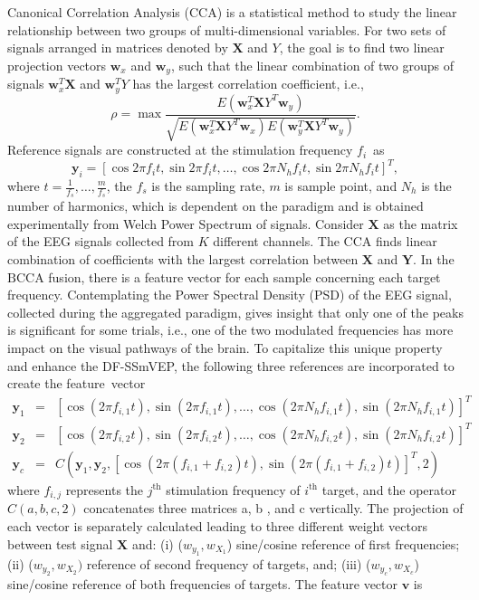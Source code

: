 \documentclass[sensors,accept,moreauthors,pdftex,10pt,a4paper]{mdpi}
\def\NH{N_h}
\def\y{\bm{y}}
\def\w{\bm{w}}
\def\Y{Y}
\def\X{\bm{X}}
\def\DCCA{\text{BCCA}}
\theoremstyle{mdpi}
\newcounter{ex}
\newcounter{re}
\theoremstyle{mdpidefinition}
\begin{document}
\noindent
Canonical Correlation Analysis (CCA) is a statistical method to study the linear relationship between two groups of multi-dimensional variables. For  two sets of signals arranged in matrices denoted by $\X$ and $\Y$, the goal is to find two linear projection vectors $\w_{x}$ and $\w_{y}$, such that the  linear combination of two groups of  signals $\w_{x}^{T}\X$ and  $\w_{y}^{T}\Y$ has the largest correlation coefficient, i.e.,
%
\begin{equation}
\rho = \max \frac{E(\w_{x}^{T}\X\Y^{T}\w_{y})}{\sqrt{E(\w_{x}^{T}\X\Y^{T}\w_{x})E(\w_{y}^{T}\X\Y^{T}\w_{y})}}.
\end{equation}
%
Reference signals are constructed at the stimulation frequency $f_{i}$~as
%
\begin{equation}
\y_{i}=[\cos 2\pi f_{i}t, \sin 2\pi f_{i}t, \ldots, \cos 2\pi \NH f_{i}t, \sin 2\pi \NH f_{i}t]^T,
\end{equation}
%
where $t = \frac{1}{f_{s}}, \ldots,\frac{m}{f_{s}}$, the $f_{s}$ is the sampling rate, $m$ is sample point, and $\NH$ is the number of harmonics, which is dependent on the paradigm and is  obtained experimentally from Welch Power Spectrum of signals. Consider $\X$ as the matrix of the EEG signals collected from $K$ different channels. The CCA finds linear combination of coefficients with the largest correlation between $\X$ and $\bm{Y}$.
 In the $\DCCA$ fusion, there is a feature vector for each sample concerning each target frequency. Contemplating the Power Spectral Density (PSD) of the EEG signal, collected during the aggregated paradigm,  gives insight that only one of the peaks is significant for some trials, i.e., one of the two modulated frequencies has more impact on the visual pathways of the brain. To capitalize this unique property and enhance the DF-SSmVEP, the following three references are incorporated to create the feature~vector
%
\begin{eqnarray}
\y_{1}&=&  [\cos(2\pi f_{i,1}t), \sin(2\pi f_{i,1}t), \ldots,\cos(2\pi \NH f_{i,1}t), \sin(2\pi \NH f_{i,1}t)]^T\\
\y_{2}&=& [\cos(2\pi f_{i,2}t), \sin(2\pi f_{i,2}t), \ldots, \cos(2\pi \NH f_{i,2}t), \sin(2\pi \NH f_{i,2}t)]^T\\
\y_{c}&=& C(\y_{1}, \y_{2},[ \cos(2\pi (f_{i,1}+f_{i,2})t), \sin(2\pi (f_{i,1}+f_{i,2})t)]^T,2)\label{nEq:eq7}
\end{eqnarray}
%
where $f_{i,j}$ represents the $j^{\text{th}}$ stimulation frequency of $i^{\text{th}}$ target, and the operator $C(a,b,c,2)$ concatenates three matrices a, b , and c vertically. The projection of each vector is separately calculated leading to three different weight vectors between test signal $\X$ and: (i) ($w_{y_1},w_{X_1}$) sine/cosine reference of first frequencies; (ii) ($w_{y_2},w_{X_2})$  reference of second frequency of targets, and; (iii) ($w_{y_{c}},w_{X_{c}}$) sine/cosine reference of both frequencies of targets. The feature vector $\bm{v}$ is
\end{document}
